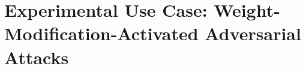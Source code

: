 \documentclass{article}
\theoremstyle{plain}
\newtheorem{corollary}[theorem]{Corollary}
\theoremstyle{definition}
\theoremstyle{remark}
\begin{document}

% 
% 
\section{Experimental Use Case: Weight- Modification-Activated Adversarial Attacks}\label{use case}

\end{document}
